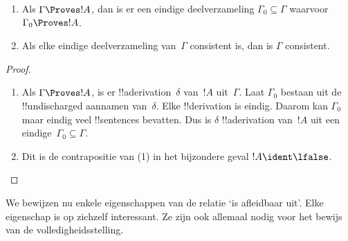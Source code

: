 \documentclass[openany]{memoir}
\begin{document}
\begin{prop}[Compactheid]
  \begin{enumerate}
  \item Als $\Gamma \Proves !A$, dan is er een eindige
    deelverzameling $\Gamma_0 \subseteq \Gamma$ waarvoor
    $\Gamma_0 \Proves !A$.
  \item Als elke eindige deelverzameling van~$\Gamma$ consistent is,
    dan is $\Gamma$ consistent.
  \end{enumerate}
\end{prop}

\begin{proof}
  \begin{enumerate}
    \item Als $\Gamma \Proves !A$, is er !!a{derivation}~$\delta$
      van~$!A$ uit~$\Gamma$. Laat $\Gamma_0$ bestaan uit de
      !!{undischarged} aannamen van~$\delta$. Elke !!{derivation} is
      eindig. Daarom kan $\Gamma_0$ maar eindig veel !!{sentence}s
      bevatten. Dus is $\delta$ !!a{derivation} van~$!A$ uit een
      eindige~$\Gamma_0 \subseteq \Gamma$.
    \item Dit is de contrapositie van (1) in het bijzondere geval
      $!A \ident \lfalse$.
  \end{enumerate}
\end{proof}
\endgroup

\begingroup
\def\olfilename{OLP-0092}
\def\olfilepath{content/first-order-logic/natural-deduction/}
\hypertarget{unit-OLP-0092}{}



      {}
      {}
      

We bewijzen nu enkele eigenschappen van de relatie
‘is afleidbaar uit’. Elke eigenschap is op zichzelf interessant. Ze
zijn ook allemaal nodig voor het bewijs van de volledigheidsstelling.
\end{document}
